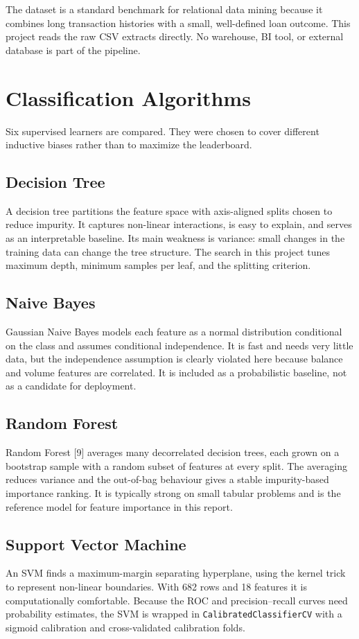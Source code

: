 The dataset is a standard benchmark for relational data mining because it combines long transaction histories with a small, well-defined loan outcome. This project reads the raw CSV extracts directly. No warehouse, BI tool, or external database is part of the pipeline.

\section{Classification Algorithms}
Six supervised learners are compared. They were chosen to cover different inductive biases rather than to maximize the leaderboard.

\subsection{Decision Tree}
A decision tree partitions the feature space with axis-aligned splits chosen to reduce impurity. It captures non-linear interactions, is easy to explain, and serves as an interpretable baseline. Its main weakness is variance: small changes in the training data can change the tree structure. The search in this project tunes maximum depth, minimum samples per leaf, and the splitting criterion.

\subsection{Naive Bayes}
Gaussian Naive Bayes models each feature as a normal distribution conditional on the class and assumes conditional independence. It is fast and needs very little data, but the independence assumption is clearly violated here because balance and volume features are correlated. It is included as a probabilistic baseline, not as a candidate for deployment.

\subsection{Random Forest}
Random Forest [9] averages many decorrelated decision trees, each grown on a bootstrap sample with a random subset of features at every split. The averaging reduces variance and the out-of-bag behaviour gives a stable impurity-based importance ranking. It is typically strong on small tabular problems and is the reference model for feature importance in this report.

\subsection{Support Vector Machine}
An SVM finds a maximum-margin separating hyperplane, using the kernel trick to represent non-linear boundaries. With 682 rows and 18 features it is computationally comfortable. Because the ROC and precision--recall curves need probability estimates, the SVM is wrapped in \texttt{CalibratedClassifierCV} with a sigmoid calibration and cross-validated calibration folds.

